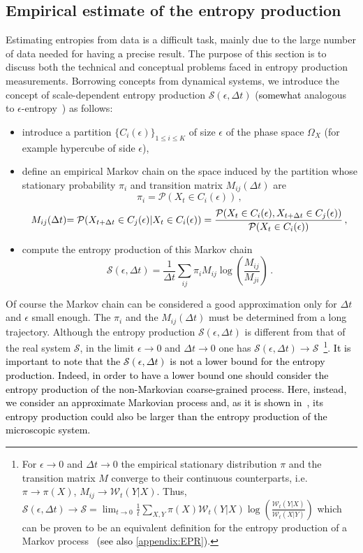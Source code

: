 \documentclass[12pt]{iopart}
\newcommand{\lx} {\left}
\newcommand{\rx} {\right}
\newcommand{\eps} {\epsilon}
\newcommand{\cP} {\mathcal{P}}
\newcommand{\cW} {\mathcal{W}}
\newcommand{\cS} {\mathcal{S}}
\begin{document}
\subsection{Empirical estimate of the entropy production}
Estimating entropies from data is a difficult task, mainly due to the large number of data needed for having \textcolor{black}{a} precise result. The purpose of this section is to discuss both the technical and conceptual problems faced in entropy production measurements. Borrowing concepts from dynamical systems, we introduce the concept of scale-dependent entropy production $\cS(\epsilon,\Delta t)$ (\textcolor{black}{somewhat} analogous to $\epsilon$-entropy~\cite{abel2000exit,gaspard1993noise,boffetta2002predictability}) as follows:
\begin{itemize}
\item introduce a partition $\{C_i(\epsilon)\}_{1\le i \le K}$ of size $\epsilon$ of the phase space $\Omega_X$ (for example hypercube of side $\epsilon$),
\item define an empirical Markov chain on the space induced by the partition whose stationary probability $\pi_i$ and transition matrix $M_{ij}(\Delta t)$ are $$\pi_i=\cP(X_t\in C_i(\epsilon))\,,$$ $$M_{ij}(\Delta t)\textcolor{black}{= \cP(X_{t+\Delta t}\in C_j(\epsilon)|X_t\in C_i(\epsilon))} = \frac{\cP(X_t\in C_i(\epsilon),X_{t+\Delta t}\in C_j(\epsilon))}{\cP(X_t\in C_i(\epsilon))}\,,$$
\item compute the entropy production of this Markov chain $$\cS(\epsilon,\Delta t)=\frac{1}{\Delta t}\sum_{ij}\pi_iM_{ij}\log\lx(\frac{M_{ij}}{M_{ji}}\rx)\,.$$
\end{itemize}
Of course the Markov chain can be considered a good approximation only for $\Delta t$ and $\eps$ small enough.
The $\pi_i$ and the $M_{ij}(\Delta t)$ must be determined from a long trajectory.
Although the entropy production $\cS(\epsilon,\Delta t)$ is different from that of the real system $\cS$, in the limit $\epsilon \to 0$ and $\Delta t\to 0$ one has $\cS(\epsilon,\Delta t)\to\cS$~\footnote{For $\epsilon \to 0$ and $\Delta t\to 0$ the empirical stationary distribution $\pi$ and the transition matrix $M$ converge to their continuous counterparts, i.e. $\pi\to \pi(X)$, $M_{ij}\to \cW_t(Y|X)$. Thus, $\cS(\epsilon,\Delta t)\to \cS=\lim_{t\to 0} \frac{1}{t}\sum_{X,Y}\pi(X)\cW_t(Y|X)\log\lx(\frac{\cW_t(Y|X)}{\cW_t(X|Y)}\rx)$ which can be proven to be an equivalent definition for the entropy production of a Markov process~\textcolor{black}{\cite{Sekimoto2010,seifertrev,cocconi2020entropy} (see also \ref{appendix:EPR})}.}. \textcolor{black}{It is important to note that the $\cS(\eps,\Delta t)$ is not a lower bound for the entropy production. Indeed, in order to have a lower bound one should consider the entropy production of the non-Markovian coarse-grained process. Here, instead, we consider an approximate Markovian process and, as it is shown in~\cite{van2023time}, its entropy production could also be larger than the entropy production of the microscopic system. }
\end{document}
